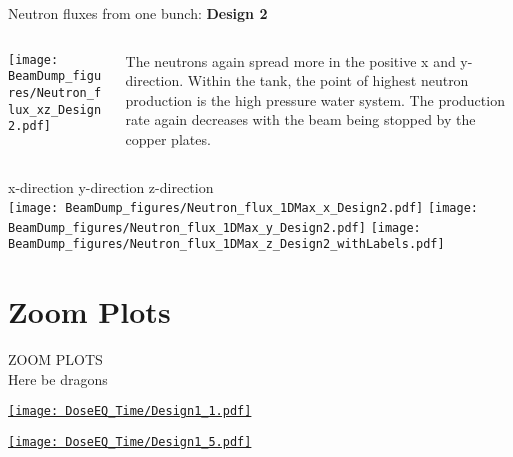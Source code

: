 \documentclass[xcolor={dvipsnames}]{beamer}
\begin{document}
\begin{frame}{Neutron fluxes from one bunch: \textbf{Design 2}}
\begin{columns}
 \begin{column}{0.5\textwidth}
    \texttt{[image: BeamDump\_figures/Neutron\_flux\_xz\_Design2.pdf]}
 \end{column}
 \begin{column}{0.5\textwidth}
  The neutrons again spread more in the positive x and y-direction. Within the tank, the point of highest neutron production is the high pressure water system. The production rate again decreases with the beam being stopped by the copper plates.
 \end{column}
\end{columns}
\hspace*{1cm} x-direction \hfill y-direction \hfill z-direction \hspace*{1cm} \\
  \texttt{[image: BeamDump\_figures/Neutron\_flux\_1DMax\_x\_Design2.pdf]}\hfill
  \texttt{[image: BeamDump\_figures/Neutron\_flux\_1DMax\_y\_Design2.pdf]}\hfill
  \texttt{[image: BeamDump\_figures/Neutron\_flux\_1DMax\_z\_Design2\_withLabels.pdf]}
\end{frame}


\section{Zoom Plots}
\begin{frame}
  \begin{center}
    \huge
    ZOOM PLOTS\\
    \tiny
    Here be dragons
  \end{center}
\end{frame}
\begin{frame}[plain]
 \hypertarget{Dose_equivalent_minute_Design1}{\hyperlink{coolingtimesprev_Design1}{\texttt{[image: DoseEQ\_Time/Design1\_1.pdf]}}}
\end{frame}
\begin{frame}[plain]
 \hypertarget{Dose_equivalent_year_Design1}{\hyperlink{coolingtimesprev_Design1}{\texttt{[image: DoseEQ\_Time/Design1\_5.pdf]}}}
\end{frame}
\end{document}
